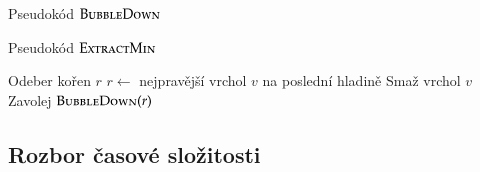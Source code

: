 \documentclass[11pt,professionalfont,aspectratio=43]{beamer}
\begin{document}
    \begin{frame}{Pseudokód $\textsc{BubbleDown}$}
        \begin{center}
            \begin{minipage}{0.8\textwidth}
                \begin{algorithm}[H]
                    \caption{$\textsc{BubbleDown}$ (oprava haldy směrem dolů)}
                \end{algorithm}
            \end{minipage}
        \end{center}
    \end{frame}

    \begin{frame}{Pseudokód $\textsc{ExtractMin}$}
        \begin{center}
            \begin{minipage}{0.8\textwidth}
                \begin{algorithm}[H]
                    \caption{Operace $\textsc{ExtractMin}$}
                    Odeber kořen $r$\;
                    $r\gets$ nejpravější vrchol $v$ na poslední hladině\;
                    Smaž vrchol $v$\;
                    Zavolej $\textsc{BubbleDown}(r)$
                \end{algorithm}
            \end{minipage}
        \end{center}
    \end{frame}

    \subsection{Rozbor časové složitosti}
\end{document}
